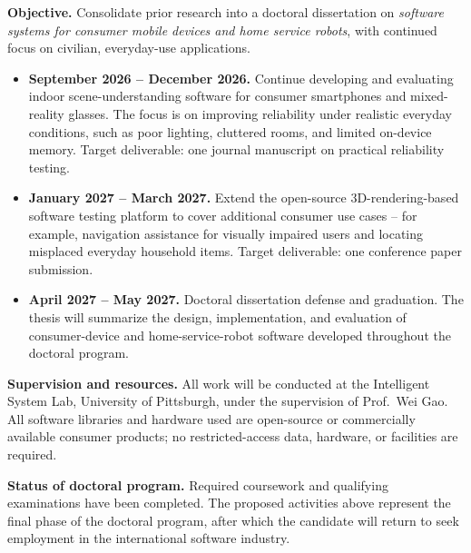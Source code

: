 \documentclass[11pt, letterpaper]{article}
\begin{document}
\textbf{Objective.} Consolidate prior research into a doctoral dissertation on \textit{software systems for consumer mobile devices and home service robots}, with continued focus on civilian, everyday-use applications.

\begin{itemize}[leftmargin=1.1em, itemsep=5pt, topsep=4pt]
  \item \textbf{September 2026 -- December 2026.} Continue developing and evaluating indoor scene-understanding software for consumer smartphones and mixed-reality glasses. The focus is on improving reliability under realistic everyday conditions, such as poor lighting, cluttered rooms, and limited on-device memory. Target deliverable: one journal manuscript on practical reliability testing.

  \item \textbf{January 2027 -- March 2027.} Extend the open-source 3D-rendering-based software testing platform to cover additional consumer use cases -- for example, navigation assistance for visually impaired users and locating misplaced everyday household items. Target deliverable: one conference paper submission.

  \item \textbf{April 2027 -- May 2027.} Doctoral dissertation defense and graduation. The thesis will summarize the design, implementation, and evaluation of consumer-device and home-service-robot software developed throughout the doctoral program.
\end{itemize}

\textbf{Supervision and resources.} All work will be conducted at the Intelligent System Lab, University of Pittsburgh, under the supervision of Prof.~Wei Gao. All software libraries and hardware used are open-source or commercially available consumer products; no restricted-access data, hardware, or facilities are required.

\textbf{Status of doctoral program.} Required coursework and qualifying examinations have been completed. The proposed activities above represent the final phase of the doctoral program, after which the candidate will return to seek employment in the international software industry.
\end{document}
